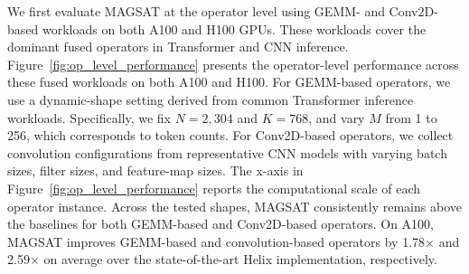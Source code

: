 We first evaluate MAGSAT at the operator level using GEMM- and
Conv2D-based workloads on both A100 and H100 GPUs. These
workloads cover the dominant fused operators in Transformer and CNN
inference. 
Figure~\ref{fig:op_level_performance} presents the operator-level
performance across these fused workloads on both A100 and H100. 
For GEMM-based operators, we use a dynamic-shape setting derived from
common Transformer inference workloads. Specifically, we fix $N=2{,}304$ and $K=768$, and vary
$M$ from 1 to 256, which corresponds to token counts. 
For Conv2D-based operators, we collect convolution configurations from representative CNN models with varying batch sizes, filter sizes, and feature-map sizes. 
The x-axis in
Figure~\ref{fig:op_level_performance} reports the computational scale of
each operator instance.
Across the tested shapes, MAGSAT consistently remains above the baselines
for both GEMM-based and Conv2D-based operators.
On A100, MAGSAT improves GEMM-based and convolution-based operators by 1.78$\times$ and 2.59$\times$ on average over the state-of-the-art Helix implementation, respectively.
